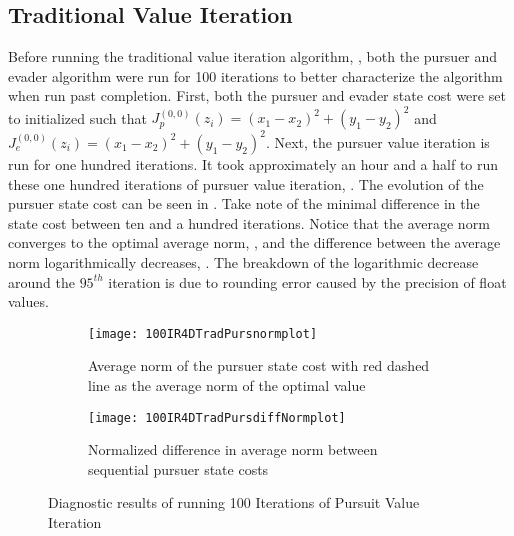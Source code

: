 \subsection{Traditional Value Iteration}
Before running the traditional value iteration algorithm, , both the pursuer and evader algorithm were run for 100 iterations to better characterize the algorithm when run past completion. First, both the pursuer and evader state cost were set to initialized such that $J^{(0,0)}_p(z_i) = (x_1-x_2)^2+(y_1-y_2)^2$ and $J^{(0,0)}_e(z_i) = (x_1-x_2)^2+(y_1-y_2)^2$. Next, the pursuer value iteration is run for one hundred iterations. It took approximately an hour and a half to run these one hundred iterations of pursuer value iteration, . The evolution of the pursuer state cost can be seen  in . Take note of the minimal difference in the state cost between ten and a hundred iterations. Notice that the average norm converges to the optimal average norm, , and the difference between the average norm logarithmically decreases, . The breakdown of the logarithmic decrease around the $95^{th}$ iteration is due to rounding error caused by the precision of float values.  
\begin{figure}[h!]
\centering
\begin{subfigure}[t]{0.475\textwidth}
	\centering
	\texttt{[image: 100IR4DTradPursnormplot]}
	\caption{Average norm of the pursuer state cost with red dashed line as the average norm of the optimal value}
	\label{100IR4DTnp}
\end{subfigure}
\hfill
\begin{subfigure}[t]{0.475\textwidth}
	\centering
	\texttt{[image: 100IR4DTradPursdiffNormplot]}
	\caption{Normalized difference in average norm between sequential pursuer state costs}
	\label{100IR4DTdnp}
\end{subfigure}
\caption{Diagnostic results of running 100 Iterations of Pursuit Value Iteration}
\label{100IR4DTdiag}
\end{figure} 
